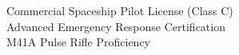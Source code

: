    Commercial Spaceship Pilot License (Class C)\\
    Advanced Emergency Response Certification\\
    M41A Pulse Rifle Proficiency\\
